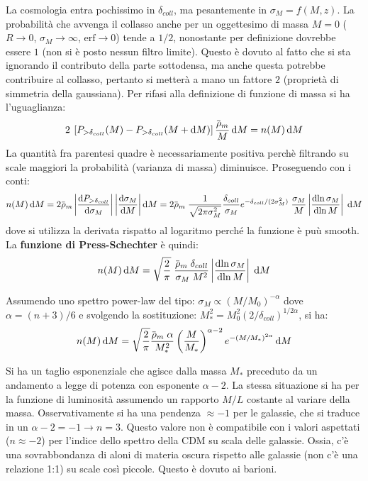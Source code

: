 La cosmologia entra pochissimo in $\delta_{coll}$, ma pesantemente in $\sigma_M=f(M,z)$. La probabilità che avvenga il collasso anche per un oggettesimo di massa $M= 0$ ($R\to 0$, $\sigma_M \to \infty$, $\mathrm{erf}\to 0$) tende a $1/2$, nonostante per definizione dovrebbe essere $1$ (non si è posto nessun filtro limite). Questo è dovuto al fatto che si sta ignorando il contributo della parte sottodensa, ma anche questa potrebbe contribuire al collasso, pertanto si metterà a mano un fattore $2$ (proprietà di simmetria della gaussiana). Per rifasi alla definizione di funzione di massa si ha l'uguaglianza:
\begin{equation*}
    2\: \left[P_{>\delta_{coll}}(M)-P_{>\delta_{coll}}(M+\d{M})\right]\frac{\overbar{\rho}_m }{M}\d{M}=n(M)\d{M}
\end{equation*}
La quantità fra parentesi quadre è necessariamente positiva perchè filtrando su scale maggiori la probabilità (varianza di massa) diminuisce. Proseguendo con i conti:
\begin{equation*}
    n(M)\d{M}= 2 \overbar{\rho}_m \left\lvert \frac{\d{P_{>\delta_{coll}}}}{\d{\sigma_M}}\right\rvert \left\lvert \frac{\d{\sigma_M}}{\d{M}}\right\rvert \d{M}=2 \overbar{\rho}_m\; \frac{1}{\sqrt{2\pi \sigma_M^2}}\frac{\delta_{coll}}{\sigma_M}e^{-\delta_{coll}/(2\sigma_M^2)}\; \frac{\sigma_M}{M} \left\lvert \frac{\d{\ln \sigma_M}}{\d{\ln M}}\right\rvert \; \d{M}
\end{equation*}
dove si utilizza la derivata rispatto al logaritmo perché la funzione è puù smooth. La \textbf{funzione di Press-Schechter} è quindi:
\begin{equation}
    n(M)\d{M}= \sqrt{\frac{2}{\pi}}  \;\frac{\overbar{\rho}_m\; \delta_{coll}}{\sigma_M\; M^2}\left\lvert \frac{\d{\ln \sigma_M}}{\d{\ln M}}\right\rvert \; \d{M}
\end{equation}

Assumendo uno spettro power-law del tipo: $\sigma_M\propto (M/M_0)^{-\alpha}$ dove $\alpha = (n+3)/6$ e svolgendo la sostituzione: $M_*^2=M_0^2 (2/\delta_{coll})^{1/2\alpha}$, si ha:
\begin{equation}
    n(M)\d{M}= \sqrt{\frac{2}{\pi}} \frac{\overbar{\rho}_m\; \alpha}{M_*^2}\left(\frac{M}{M_*}\right)^{\alpha -2} e^{-(M/M_*)^{2\alpha}}\d{M}
\end{equation}

Si ha un taglio esponenziale che agisce dalla massa $M_*$ preceduto da un andamento a legge di potenza con esponente $\alpha-2$. La stessa situazione si ha per la funzione di luminosità assumendo un rapporto $M/L$ costante al variare della massa. Osservativamente si ha una pendenza $\approx -1$ per le galassie, che si traduce in un $\alpha -2=-1 \to n = 3$. Questo valore non è compatibile con i valori aspettati ($n\approx -2$) per l'indice dello spettro della CDM su scala delle galassie. Ossia, c'è una sovrabbondanza di aloni di materia oscura rispetto alle galassie (non c'è una relazione 1:1) su scale così piccole. Questo è dovuto ai barioni.

